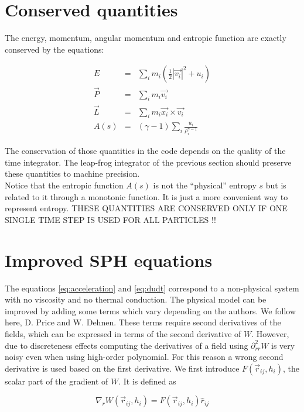 \documentclass[a4paper,10pt]{report}
\begin{document}
\section{Conserved quantities}

The energy, momentum, angular momentum and entropic function are exactly conserved by the equations:

\begin{eqnarray}
E &=&\sum_i m_i\left(\frac{1}{2}|\vec{v_i}|^2+u_i\right)\\
\vec{P} &=&\sum_i m_i \vec{v_i}\\
\vec{L} &=& \sum_i m_i \vec{x_i} \times \vec{v_i}\\ 
A(s) &=& \left(\gamma -1 \right)\sum_i \frac{u_i}{\rho_i^{\gamma - 1}}
\end{eqnarray}

The conservation of those quantities in the code depends on the quality of the time integrator. The leap-frog
integrator of the previous section should preserve these quantities to machine precision.\\
Notice that the entropic function $A(s)$ is not the ``physical'' entropy $s$ but is related to it through a monotonic
function. It is just a more convenient way to represent entropy.
THESE QUANTITIES ARE CONSERVED ONLY IF ONE SINGLE TIME STEP IS USED FOR ALL PARTICLES !!


\section{Improved SPH equations}

The equations \ref{eq:acceleration} and \ref{eq:dudt} correspond to a non-physical system with no viscosity and no
thermal conduction. The physical model can be improved by adding some terms which vary depending on the authors. We
follow here, D. Price and W. Dehnen.
These terms require second derivatives of the fields, which can be expressed in terms of the second derivative of $W$.
However, due to discreteness effects computing the derivatives of a field using $\partial^2_{rr}W$ is very noisy even
when using high-order polynomial. For this reason a wrong second derivative is used based on the first derivative. We
first introduce $F(\vec{r}_{ij},h_i)$, the scalar part of the gradient of $W$. It is defined as

\begin{equation}
 \nabla_r W(\vec{r}_{ij},h_i) = F(\vec{r}_{ij},h_i) \hat{r}_{ij}
\end{equation}
\end{document}
